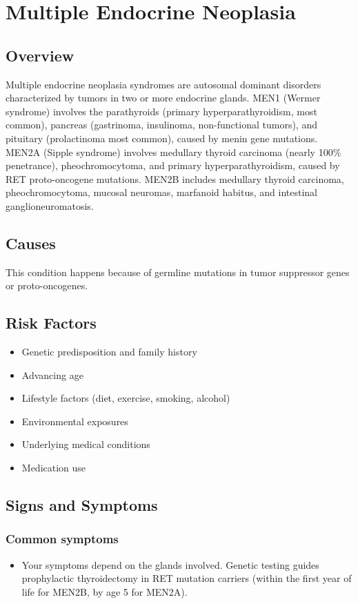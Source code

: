 \chapter{Multiple Endocrine Neoplasia}
\label{sec:Multiple Endocrine Neoplasia}

\section{Overview}
Multiple endocrine neoplasia syndromes are autosomal dominant disorders characterized by tumors in two or more endocrine glands. MEN1 (Wermer syndrome) involves the parathyroids (primary hyperparathyroidism, most common), pancreas (gastrinoma, insulinoma, non-functional tumors), and pituitary (prolactinoma most common), caused by menin gene mutations. MEN2A (Sipple syndrome) involves medullary thyroid carcinoma (nearly 100\% penetrance), pheochromocytoma, and primary hyperparathyroidism, caused by RET proto-oncogene mutations. MEN2B includes medullary thyroid carcinoma, pheochromocytoma, mucosal neuromas, marfanoid habitus, and intestinal ganglioneuromatosis.
\section{Causes}
This condition happens because of germline mutations in tumor suppressor genes or proto-oncogenes.     
\section{Risk Factors}

\begin{itemize}[noitemsep]
  \item Genetic predisposition and family history
  \item Advancing age
  \item Lifestyle factors (diet, exercise, smoking, alcohol)
  \item Environmental exposures
  \item Underlying medical conditions
  \item Medication use
\end{itemize}
\section{Signs and Symptoms}

\subsection{Common symptoms}
\begin{itemize}[noitemsep]
  \item Your symptoms depend on the glands involved. Genetic testing guides prophylactic thyroidectomy in RET mutation carriers (within the first year of life for MEN2B, by age 5 for MEN2A). 
  \end{itemize}

